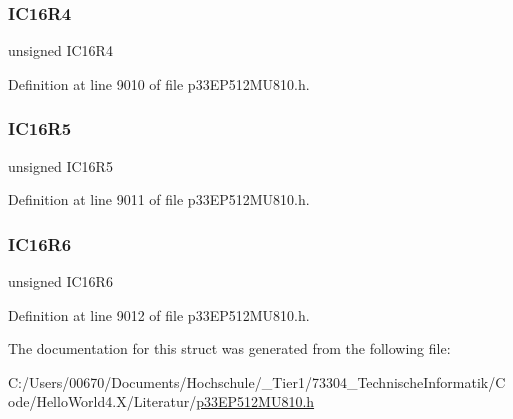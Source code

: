 \subsubsection{\texorpdfstring{I\+C16\+R4}{IC16R4}}
{\footnotesize\ttfamily unsigned I\+C16\+R4}



Definition at line 9010 of file p33\+E\+P512\+M\+U810.\+h.

\mbox{\label{structtag_r_p_i_n_r36_b_i_t_s_a334369a57d226638946fd4962194a733}} 
\subsubsection{\texorpdfstring{I\+C16\+R5}{IC16R5}}
{\footnotesize\ttfamily unsigned I\+C16\+R5}



Definition at line 9011 of file p33\+E\+P512\+M\+U810.\+h.

\mbox{\label{structtag_r_p_i_n_r36_b_i_t_s_a3bd443c7534ba240bfb70c83c395991e}} 
\subsubsection{\texorpdfstring{I\+C16\+R6}{IC16R6}}
{\footnotesize\ttfamily unsigned I\+C16\+R6}



Definition at line 9012 of file p33\+E\+P512\+M\+U810.\+h.



The documentation for this struct was generated from the following file\+:\begin{DoxyCompactItemize}
\item 
C\+:/\+Users/00670/\+Documents/\+Hochschule/\+\_\+\+Tier1/73304\+\_\+\+Technische\+Informatik/\+Code/\+Hello\+World4.\+X/\+Literatur/\hyperlink{p33_e_p512_m_u810_8h}{p33\+E\+P512\+M\+U810.\+h}\end{DoxyCompactItemize}

